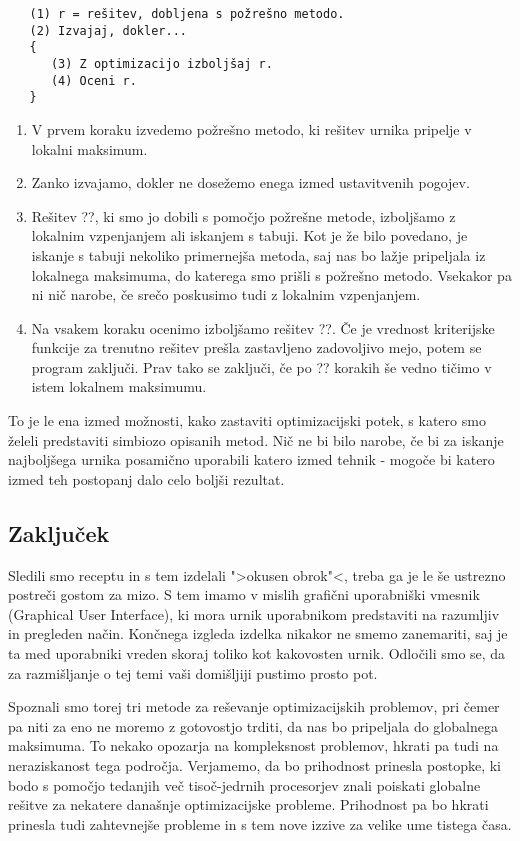 \documentclass[a4paper,10pt]{article}
\begin{document}
\begin{verbatim}
   (1) r = rešitev, dobljena s požrešno metodo.
   (2) Izvajaj, dokler...
   {
      (3) Z optimizacijo izboljšaj r.
      (4) Oceni r.
   }
\end{verbatim}
\begin{enumerate}
   \item
   V prvem koraku izvedemo požrešno metodo, ki rešitev urnika pripelje v lokalni maksimum.
   \item    
   Zanko izvajamo, dokler ne dosežemo enega izmed ustavitvenih pogojev.

   \item
   Rešitev ??, ki smo jo dobili s pomočjo požrešne metode, izboljšamo z lokalnim vzpenjanjem
   ali iskanjem s tabuji. Kot je že bilo povedano, je iskanje s tabuji nekoliko primernejša metoda,
   saj nas bo lažje pripeljala iz lokalnega maksimuma, do katerega smo prišli s požrešno metodo.
   Vsekakor pa ni nič narobe, če srečo poskusimo tudi z lokalnim vzpenjanjem.
\item
   Na vsakem koraku ocenimo izboljšamo rešitev ??. Če je vrednost kriterijske funkcije
   za trenutno rešitev prešla zastavljeno zadovoljivo mejo, potem se program zaključi. Prav tako
   se zaključi, če po ?? korakih še vedno tičimo v istem lokalnem maksimumu.
\end{enumerate}
\noindent
To je le ena izmed možnosti, kako zastaviti optimizacijski potek, s katero smo želeli predstaviti
simbiozo opisanih metod. Nič ne bi bilo narobe, če bi za iskanje najboljšega urnika posamično
uporabili katero izmed tehnik - mogoče bi katero izmed teh postopanj dalo celo boljši rezultat.

\subsection{Zaključek}

Sledili smo receptu in s tem izdelali ">okusen obrok"<, treba ga je le še ustrezno postreči
gostom za mizo. S tem imamo v mislih grafični uporabniški vmesnik (Graphical
User Interface), ki mora urnik uporabnikom predstaviti na razumljiv in
pregleden način. Končnega izgleda izdelka nikakor ne smemo zanemariti, saj je ta med uporabniki
vreden skoraj toliko kot kakovosten urnik. Odločili smo se, da za razmišljanje o tej temi vaši
domišljiji pustimo prosto pot.

Spoznali smo torej tri metode za reševanje optimizacijskih problemov, pri čemer pa niti za eno
ne moremo z gotovostjo trditi, da nas bo pripeljala do globalnega maksimuma. To nekako opozarja
na kompleksnost problemov, hkrati pa tudi na neraziskanost tega področja. Verjamemo, da bo
prihodnost prinesla postopke, ki bodo s pomočjo tedanjih več tisoč-jedrnih procesorjev znali
poiskati globalne rešitve za nekatere današnje optimizacijske probleme. Prihodnost pa bo
hkrati prinesla tudi zahtevnejše probleme in s tem nove izzive za velike ume tistega časa.
\end{document}

